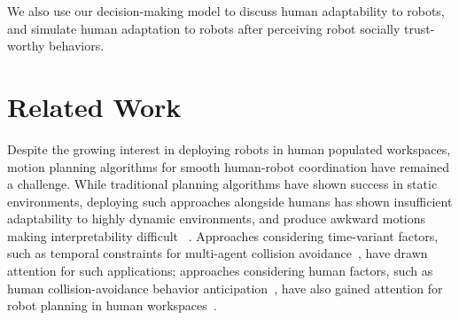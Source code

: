 \documentclass[letterpaper, 10 pt, conference]{ieeeconf}  %
\begin{document}
We also use our decision-making model to discuss human adaptability to robots,
and simulate human adaptation to robots after perceiving robot 
socially trust-worthy behaviors. 



\vspace{-0.3em}
\section{Related Work}
\vspace{-0.2em}
Despite the growing interest in deploying robots in human populated workspaces, 
motion planning algorithms for smooth human-robot coordination have remained a 
challenge. While traditional planning algorithms have shown success in static 
environments, deploying such approaches alongside humans has shown 
insufficient adaptability to highly dynamic environments, and produce awkward 
motions making 
interpretability difficult
~\cite{lichtenthaler2012influence,dragan2013legibility,kruse2012legible}. 
Approaches considering time-variant factors, such as temporal constraints for multi-agent collision 
avoidance~\cite{van2011reciprocal}, have drawn attention for such 
applications; approaches considering human factors, such as human 
collision-avoidance behavior anticipation~\cite{helbing1995social}, have also gained attention for robot planning in human workspaces~\cite{shiomi2014towards}.
\end{document}
